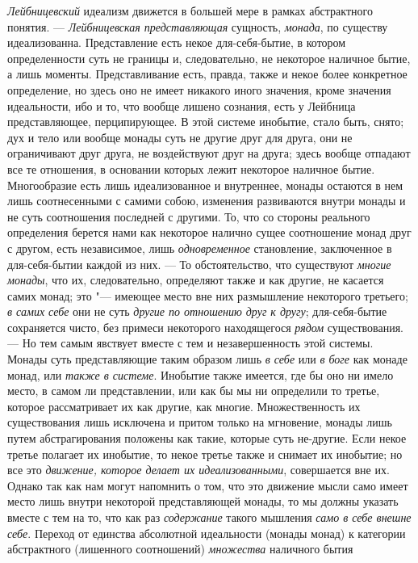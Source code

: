 {\em Лейбницевский} идеализм движется в большей мере в
рамках абстрактного понятия. — {\em Лейбницевская
представляющая} сущность, {\em монада}, по существу
идеализованна. Представление есть некое для-себя-бытие, в котором
определенности суть не границы и, следовательно, не некоторое наличное
бытие, а лишь моменты. Представливание есть, правда, также и некое более
конкретное определение, но здесь оно не имеет никакого иного значения,
кроме значения идеальности, ибо и то, что вообще лишено сознания, есть у
Лейбница представляющее, перципирующее. В этой системе инобытие, стало
быть, снято; дух и тело или вообще монады суть не другие друг для друга,
они не ограничивают друг друга, не воздействуют друг на друга; здесь вообще
отпадают все те отношения, в основании которых лежит некоторое наличное
бытие. Многообразие есть лишь идеализованное и внутреннее, монады остаются
в нем лишь соотнесенными с самими собою, изменения развиваются внутри
монады и не суть соотношения последней с другими. То, что со стороны
реального определения берется нами как некоторое налично сущее соотношение
монад друг с другом, есть независимое, лишь
{\em одновременное} становление, заключенное в
для-себя-бытии каждой из них. — То обстоятельство, что существуют
{\em многие монады}, что их, следовательно, определяют
также и как другие, не касается самих монад; это "--- имеющее место вне них
размышление некоторого третьего; {\em в самих себе} они
не суть {\em другие по отношению друг к другу};
для-себя-бытие сохраняется чисто, без примеси некоторого находящегося
{\em рядом} существования. — Но тем самым явствует
вместе с тем и незавершенность этой системы. Монады суть представляющие
таким образом лишь {\em в себе} или
{\em в боге} как монаде монад, или
{\em также в системе}. Инобытие также имеется, где бы
оно ни имело место, в самом ли представлении, или как бы мы ни определили
то третье, которое рассматривает их как другие, как многие. Множественность
их существования лишь исключена и притом только на мгновение, монады лишь
путем абстрагирования положены как такие, которые суть не-другие. Если
некое третье полагает их инобытие, то некое третье также и снимает их
инобытие; но все это {\em движение, которое делает их
идеализованными}, совершается вне их. Однако так как нам могут напомнить о
том, что это движение мысли само имеет место лишь внутри некоторой
представляющей монады, то мы должны указать вместе с тем на то, что как раз
{\em содержание} такого мышления
{\em само в себе внешне себе}. Переход от единства
абсолютной идеальности (монады монад) к категории абстрактного (лишенного
соотношений) {\em множества} наличного бытия
